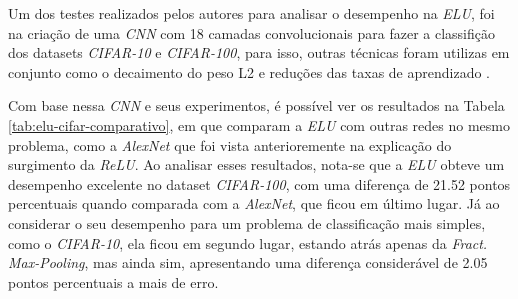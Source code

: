Um dos testes realizados pelos autores para analisar o desempenho na \textit{ELU}, foi na criação de uma \textit{CNN} com 18 camadas convolucionais para fazer a classifição dos datasets \textit{CIFAR-10} e \textit{CIFAR-100}, para isso, outras técnicas foram utilizas em conjunto como o decaimento do peso L2 e reduções das taxas de aprendizado \parencite{ELUArticle}.

Com base nessa \textit{CNN} e seus experimentos, é possível ver os resultados na Tabela \ref{tab:elu-cifar-comparativo}, em que \textcite{ELUArticle} comparam a \textit{ELU} com outras redes no mesmo problema, como a \textit{AlexNet} que foi vista anterioremente na explicação do surgimento da \textit{ReLU}. Ao analisar esses resultados, nota-se que a \textit{ELU} obteve um desempenho excelente no dataset \textit{CIFAR-100}, com uma diferença de 21.52 pontos percentuais quando comparada com a \textit{AlexNet}, que ficou em último lugar. Já ao considerar o seu desempenho para um problema de classificação mais simples, como o \textit{CIFAR-10}, ela ficou em segundo lugar, estando atrás apenas da \textit{Fract. Max-Pooling}, mas ainda sim, apresentando uma diferença considerável de 2.05 pontos percentuais a mais de erro. 

